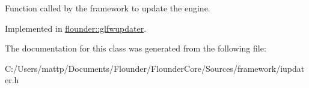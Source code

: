 Function called by the framework to update the engine. 



Implemented in \hyperlink{classflounder_1_1glfwupdater_a2443d270f702e67ab44c7afb88c71a5e}{flounder\+::glfwupdater}.



The documentation for this class was generated from the following file\+:\begin{DoxyCompactItemize}
\item 
C\+:/\+Users/mattp/\+Documents/\+Flounder/\+Flounder\+Core/\+Sources/framework/iupdater.\+h\end{DoxyCompactItemize}
